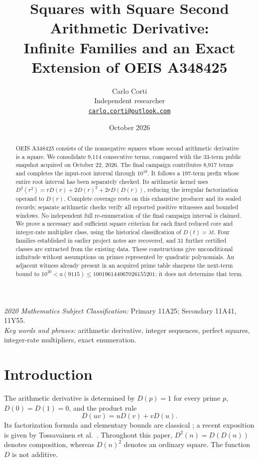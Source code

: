 \documentclass[11pt]{article}
\title{Squares with Square Second Arithmetic Derivative:\\
Infinite Families and an Exact Extension of OEIS A348425}
\author{Carlo Corti\\Independent researcher\\
\href{mailto:carlo.corti@outlook.com}{\texttt{carlo.corti@outlook.com}}}
\date{October 2026}
\theoremstyle{definition}
\theoremstyle{remark}
\begin{document}
\maketitle
\begin{abstract}
OEIS A348425 consists of the nonnegative squares whose second arithmetic
derivative is a square. We consolidate 9,114 consecutive terms, compared
with the 33-term public snapshot acquired on October 22, 2026. The final
campaign contributes 8,917 terms and completes the input-root interval
through $10^{10}$. It follows a 197-term prefix whose entire root interval
has been separately checked. Its arithmetic
kernel uses $D^{2}(r^{2})=rD(r)+2D(r)^{2}+2rD(D(r))$, reducing the irregular
factorization operand to $D(r)$. Complete coverage rests on this exhaustive
producer and its sealed records; separate arithmetic checks verify all
reported positive witnesses and bounded windows. No independent full
re-enumeration of the final campaign interval is claimed. We prove a
necessary and sufficient square criterion for each fixed reduced core and
integer-rate multiplier class, using the historical classification of
$D(t)=\lambda t$. Four families established in earlier project notes are
recovered, and 31 further certified classes are extracted from the existing
data. These constructions give unconditional infinitude without assumptions
on primes represented by quadratic polynomials. An adjacent witness already
present in an acquired prime table sharpens the next-term bound to
$10^{20}<a(9115)\leq100196144067026155201$; it does not determine that term.
\end{abstract}
\noindent\textit{2020 Mathematics Subject Classification:} Primary 11A25;
Secondary 11A41, 11Y55.\\
\textit{Key words and phrases:} arithmetic derivative, integer sequences,
perfect squares, integer-rate multipliers, exact enumeration.

\section{Introduction}\label{sec:intro}
The arithmetic derivative is determined by $D(p)=1$ for every prime $p$,
$D(0)=D(1)=0$, and the product rule
\begin{equation}\label{eq:leibniz}
 D(uv)=uD(v)+vD(u).
\end{equation}
Its factorization formula and elementary bounds are classical
\cite{barbeau,ufn}; a recent exposition is given by Tossavainen et al.\
\cite{survey}. Throughout this paper, $D^{2}(n)=D(D(n))$ denotes composition,
whereas $D(n)^{2}$ denotes an ordinary square. The function $D$ is not additive.
\end{document}
